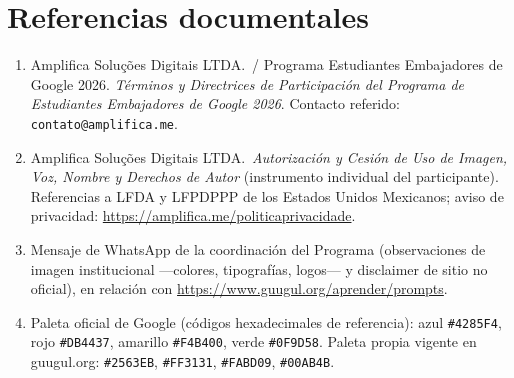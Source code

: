 \documentclass[11pt,a4paper]{article}
\begin{document}
\appendix
\section{Referencias documentales}

\begin{enumerate}[leftmargin=*]
  \item Amplifica Soluções Digitais LTDA.\ / Programa Estudiantes Embajadores de Google 2026. \emph{Términos y Directrices de Participación del Programa de Estudiantes Embajadores de Google 2026}. Contacto referido: \texttt{contato@amplifica.me}.
  \item Amplifica Soluções Digitais LTDA.\ \emph{Autorización y Cesión de Uso de Imagen, Voz, Nombre y Derechos de Autor} (instrumento individual del participante). Referencias a LFDA y LFPDPPP de los Estados Unidos Mexicanos; aviso de privacidad: \url{https://amplifica.me/politicaprivacidade}.
  \item Mensaje de WhatsApp de la coordinación del Programa (observaciones de imagen institucional ---colores, tipografías, logos--- y disclaimer de sitio no oficial), en relación con \url{https://www.guugul.org/aprender/prompts}.
  \item Paleta oficial de Google (códigos hexadecimales de referencia): azul \texttt{\#4285F4}, rojo \texttt{\#DB4437}, amarillo \texttt{\#F4B400}, verde \texttt{\#0F9D58}. Paleta propia vigente en guugul.org: \texttt{\#2563EB}, \texttt{\#FF3131}, \texttt{\#FABD09}, \texttt{\#00AB4B}.
\end{enumerate}
\end{document}
